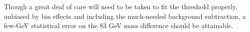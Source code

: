 \documentclass[12pt]{article}
\begin{document}
Though a great deal of care will need to be taken to fit the threshold
properly, unbiased by bin effects and including the much-needed
background subtraction, a few-GeV statistical error on the 83 GeV mass
difference should be attainable.











\end{document}
